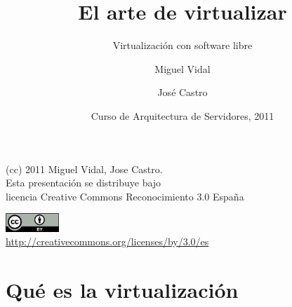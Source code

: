 \documentclass{beamer}
\begin{document}
\title{El arte de virtualizar}
\subtitle{Virtualización con software libre}
\author{Miguel Vidal \and José Castro}
\date[CASUL 2011]{Curso de Arquitectura de Servidores, 2011}


\begin{frame}
  \vspace{2cm}
  \begin{flushright}
    {\small (cc) 2011 Miguel Vidal, Jose Castro.} \\
    \medskip
    {\scriptsize Esta presentación se distribuye bajo \\ licencia Creative Commons Reconocimiento 3.0 España}
  \end{flushright}
  \begin{center}
    \href{http://creativecommons.org/licenses/by/3.0/es}{\includegraphics[width=2cm]{format/cc-by.png}} \\
    {\tiny \url{http://creativecommons.org/licenses/by/3.0/es}}
  \end{center}
\end{frame}%


\usebackgroundtemplate{}



\section{Qué es la virtualización}
\end{document}
